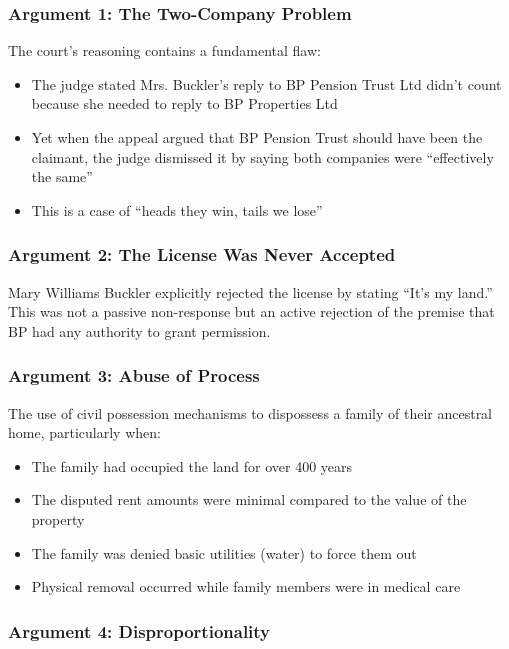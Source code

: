\documentclass[11pt,a4paper]{article}
\begin{document}
\subsubsection{Argument 1: The Two-Company Problem}

\begin{grievance}
The court's reasoning contains a fundamental flaw:
\begin{itemize}
    \item The judge stated Mrs. Buckler's reply to BP Pension Trust Ltd didn't count because she needed to reply to BP Properties Ltd
    \item Yet when the appeal argued that BP Pension Trust should have been the claimant, the judge dismissed it by saying both companies were ``effectively the same''
    \item This is a case of ``heads they win, tails we lose''
\end{itemize}
\end{grievance}

\subsubsection{Argument 2: The License Was Never Accepted}

Mary Williams Buckler explicitly rejected the license by stating ``It's my land.'' This was not a passive non-response but an active rejection of the premise that BP had any authority to grant permission.

\subsubsection{Argument 3: Abuse of Process}

The use of civil possession mechanisms to dispossess a family of their ancestral home, particularly when:
\begin{itemize}
    \item The family had occupied the land for over 400 years
    \item The disputed rent amounts were minimal compared to the value of the property
    \item The family was denied basic utilities (water) to force them out
    \item Physical removal occurred while family members were in medical care
\end{itemize}

\subsubsection{Argument 4: Disproportionality}
\end{document}
